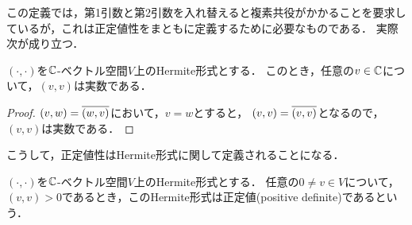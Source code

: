 この定義では，第1引数と第2引数を入れ替えると複素共役がかかることを要求しているが，これは正定値性をまともに定義するために必要なものである．
実際次が成り立つ．
\begin{prop}
  $(\cdot,\cdot)$を$\mathbb{C}$-ベクトル空間$V$上のHermite形式とする．
  このとき，任意の$v \in \mathbb{C}$について，$(v,v)$は実数である．
\end{prop}
\begin{proof}
$(v,w)=\overline{(w,v)}$において，$v=w$とすると，
$(v,v)=\overline{(v,v)}$となるので，$(v,v)$は実数である．
\end{proof}
こうして，正定値性はHermite形式に関して定義されることになる．
\begin{dfn}
  $(\cdot,\cdot)$を$\mathbb{C}$-ベクトル空間$V$上のHermite形式とする．
  任意の$0 \neq v \in V$について，$(v,v)>0$であるとき，このHermite形式は正定値(positive definite)であるという．
\end{dfn}

